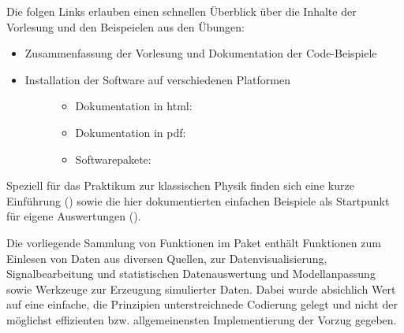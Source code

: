 \documentclass[letterpaper,10pt,english]{sphinxmanual}
\begin{document}
Die folgen Links erlauben einen schnellen Überblick über die Inhalte
der Vorlesung und den Beispeielen aus den Übungen:
\begin{itemize}
\item {} \begin{description}
\item[{Zusammenfassung der Vorlesung und Dokumentation der Code-Beispiele}] \leavevmode
{}

\end{description}

\item {} \begin{description}
\item[{Installation der Software auf verschiedenen Platformen}] \leavevmode\begin{itemize}
\item {} 
Dokumentation in html:

\item {} 
Dokumentation in pdf:

\item {} 
Softwarepakete:

\end{itemize}

\end{description}

\end{itemize}

Speziell für das \sphinxquotedblleft{}Praktikum zur klassischen Physik\sphinxquotedblright{} finden sich eine
kurze Einführung
()
sowie die hier dokumentierten einfachen Beispiele als Startpunkt für
eigene Auswertungen
().

Die vorliegende Sammlung von Funktionen im Paket  enthält
Funktionen zum Einlesen von Daten aus diversen Quellen, zur
Datenvisualisierung, Signalbearbeitung und statistischen Datenauswertung
und Modellanpassung sowie Werkzeuge zur Erzeugung simulierter Daten.
Dabei wurde absichlich Wert auf eine einfache, die Prinzipien
unterstreichnede Codierung gelegt und nicht der möglichst effizienten
bzw. allgemeinensten Implementierung der Vorzug gegeben.
\end{document}
